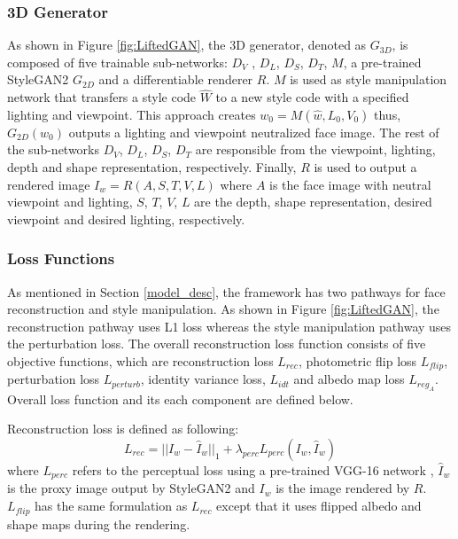 \subsubsection{3D Generator}
As shown in Figure \ref{fig:LiftedGAN}, the 3D generator, denoted as $G_{3D}$, is composed of five trainable sub-networks: $D_V$ , $D_L$, $D_S$, $D_T$, $M$, a pre-trained StyleGAN2 $G_{2D}$ and a differentiable renderer $R$. $M$ is used as style manipulation network that transfers a style code $\hat{W}$ to a new style code with a specified lighting and viewpoint. This approach creates $w_0 = M(\hat{w}, L_0, V_0)$ thus, $G_{2D}(w_0)$ outputs a lighting and viewpoint neutralized face image. The rest of the sub-networks $D_V$, $D_L$, $D_S$, $D_T$ are responsible from the viewpoint, lighting, depth and shape representation, respectively. Finally, $R$ is used to output a rendered image $I_w = R(A,S,T,V,L)$ where $A$ is the face image with neutral viewpoint and lighting, $S$, $T$, $V$, $L$ are the depth, shape representation, desired viewpoint and desired lighting, respectively.

\subsubsection{Loss Functions}
As mentioned in Section \ref{model_desc}, the framework has two pathways for face reconstruction and style manipulation. As shown in Figure \ref{fig:LiftedGAN}, the reconstruction pathway uses L1 loss whereas the style manipulation pathway uses the perturbation loss. The overall reconstruction loss function consists of five objective functions, which are reconstruction loss $L_{rec}$, photometric flip loss $L_{flip}$, perturbation loss $L_{perturb}$, identity variance loss, $L_{idt}$ and albedo map loss $L_{reg_A}$. Overall loss function and its each component are defined below.

Reconstruction loss is defined as following:
\begin{equation}
L_{rec} = || I_w - \hat{I}_w ||_1 + \lambda_{perc}  L_{perc}(I_w, \hat{I}_w)
\end{equation}
where $L_{perc}$ refers to the perceptual loss \cite{johnson2016perceptual} using a pre-trained VGG-16 network \cite{simonyan2015deep}, $\hat{I}_w$ is the proxy image output by StyleGAN2 and $I_w$ is the image rendered by $R$. $L_{flip}$ has the same formulation as $L_{rec}$ except that it uses flipped albedo and shape maps during the rendering.

